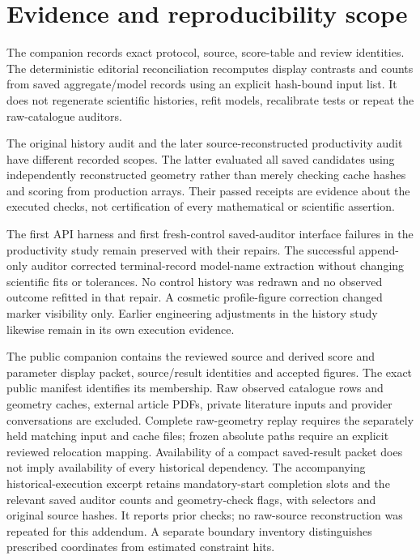 \section{Evidence and reproducibility scope}
\label{a2:repro-scope}

The companion records exact protocol, source, score-table and review
identities. The deterministic editorial reconciliation recomputes display
contrasts and counts from saved aggregate/model records using an explicit
hash-bound input list. It does not regenerate scientific histories,
refit models, recalibrate tests or repeat the raw-catalogue auditors.

The original history audit and the later source-reconstructed productivity
audit have different recorded scopes. The latter evaluated all saved
candidates using independently reconstructed geometry rather than merely
checking cache hashes and scoring from production arrays. Their passed
receipts are evidence about the executed checks, not certification of
every mathematical or scientific assertion.

The first API harness and first fresh-control saved-auditor interface
failures in the productivity study remain preserved with their repairs.
The successful append-only auditor corrected terminal-record model-name
extraction without changing scientific fits or tolerances. No control
history was redrawn and no observed outcome refitted in that repair.
A cosmetic profile-figure correction changed marker visibility only.
Earlier engineering adjustments in the history study likewise remain
in its own execution evidence.

The public companion contains the reviewed source and derived score and
parameter display packet, source/result identities and accepted figures.
The exact public manifest identifies its membership. Raw observed catalogue rows and
geometry caches, external article PDFs, private literature inputs and
provider conversations are excluded. Complete raw-geometry replay
requires the separately held matching input and cache files; frozen
absolute paths require an explicit reviewed relocation mapping.
Availability of a compact saved-result packet does not imply availability
of every historical dependency.
The accompanying historical-execution excerpt retains mandatory-start
completion slots and the relevant saved auditor counts and geometry-check
flags, with selectors and original source hashes. It reports prior checks;
no raw-source reconstruction was repeated for this addendum. A separate
boundary inventory distinguishes prescribed coordinates from estimated
constraint hits.

